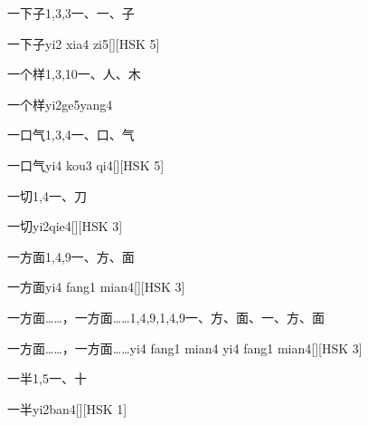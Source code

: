 \begin{entry}{一下子}{1,3,3}{⼀、⼀、⼦}
  \begin{phonetics}{一下子}{yi2 xia4 zi5}[][HSK 5]
  \end{phonetics}
\end{entry}

\begin{entry}{一个样}{1,3,10}{⼀、⼈、⽊}
  \begin{phonetics}{一个样}{yi2ge5yang4}
  \end{phonetics}
\end{entry}

\begin{entry}{一口气}{1,3,4}{⼀、⼝、⽓}
  \begin{phonetics}{一口气}{yi4 kou3 qi4}[][HSK 5]
  \end{phonetics}
\end{entry}

\begin{entry}{一切}{1,4}{⼀、⼑}
  \begin{phonetics}{一切}{yi2qie4}[][HSK 3]
  \end{phonetics}
\end{entry}

\begin{entry}{一方面}{1,4,9}{⼀、⽅、⾯}
  \begin{phonetics}{一方面}{yi4 fang1 mian4}[][HSK 3]
  \end{phonetics}
\end{entry}

\begin{entry}{一方面……，一方面……}{1,4,9,1,4,9}{⼀、⽅、⾯、⼀、⽅、⾯}
  \begin{phonetics}{一方面……，一方面……}{yi4 fang1 mian4 yi4 fang1 mian4}[][HSK 3]
  \end{phonetics}
\end{entry}

\begin{entry}{一半}{1,5}{⼀、⼗}
  \begin{phonetics}{一半}{yi2ban4}[][HSK 1]
  \end{phonetics}
\end{entry}

